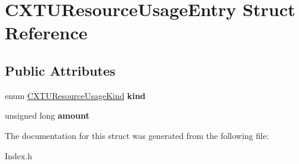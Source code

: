 \hypertarget{structCXTUResourceUsageEntry}{}\section{C\+X\+T\+U\+Resource\+Usage\+Entry Struct Reference}
\label{structCXTUResourceUsageEntry}
\subsection*{Public Attributes}
\begin{DoxyCompactItemize}
\item 
\mbox{\label{structCXTUResourceUsageEntry_a32b8e77e7deef645fab9dddca0404c95}} 
enum \hyperlink{group__CINDEX__TRANSLATION__UNIT_ga13810240df7c205de04daac58f956396}{C\+X\+T\+U\+Resource\+Usage\+Kind} {\bfseries kind}
\item 
\mbox{\label{structCXTUResourceUsageEntry_adb8ed4afc1ece830d371f62f3d0963aa}} 
unsigned long {\bfseries amount}
\end{DoxyCompactItemize}


The documentation for this struct was generated from the following file\+:\begin{DoxyCompactItemize}
\item 
Index.\+h\end{DoxyCompactItemize}
